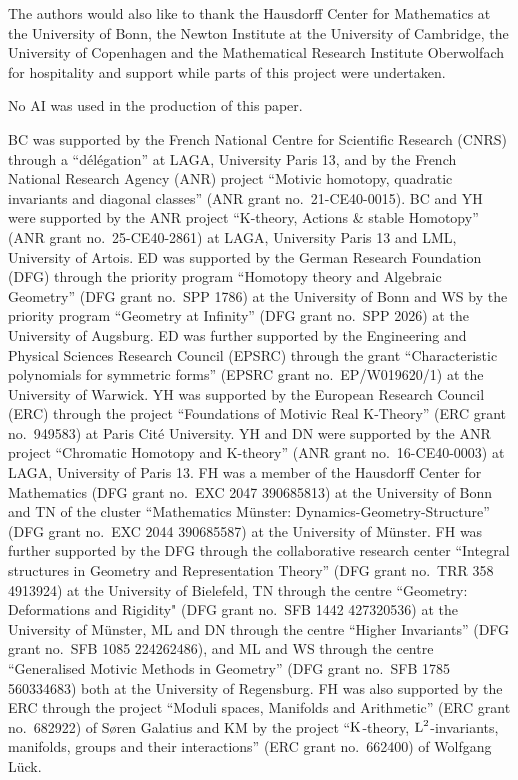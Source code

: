 The authors would also like to thank the Hausdorff Center for Mathematics at the University of Bonn, the Newton Institute at the University of Cambridge, the University of Copenhagen and the Mathematical Research Institute Oberwolfach for hospitality and support while parts of this project were undertaken.
\medskip

No AI was used in the production of this paper.
\medskip

BC was supported by the French National Centre for Scientific Research (CNRS) through a ``délégation'' at LAGA, University Paris 13, and by the French National Research Agency (ANR) project ``Motivic homotopy, quadratic invariants and diagonal classes'' (ANR grant no.\ 21-CE40-0015).
BC and YH were supported by the ANR project ``K-theory, Actions \& stable Homotopy'' (ANR grant no.\ 25-CE40-2861) at LAGA, University Paris 13 and LML, University of Artois.
ED was supported by the German Research Foundation (DFG) through the priority program ``Homotopy theory and Algebraic Geometry'' (DFG grant no.\ SPP 1786) at the University of Bonn and WS by the priority program ``Geometry at Infinity'' (DFG grant no.\ SPP 2026) at the University of Augsburg. ED was further supported by the Engineering and Physical Sciences Research Council (EPSRC) through the grant ``Characteristic polynomials for symmetric forms'' (EPSRC grant no.\ EP/W019620/1) at the University of Warwick.
YH was supported by the European Research Council (ERC) through the project ``Foundations of Motivic Real K-Theory'' (ERC grant no.\ 949583) at Paris Cité University.
YH and DN were supported by the ANR project ``Chromatic Homotopy and K-theory'' (ANR grant no.\ 16-CE40-0003) at LAGA, University of Paris 13.
FH was a member of the Hausdorff Center for Mathematics (DFG grant no.\ EXC 2047 390685813) at the University of Bonn and TN of the cluster ``Mathematics Münster: Dynamics-Geometry-Structure'' (DFG grant no.\ EXC 2044 390685587) at the University of Münster. 
FH was further supported by the DFG through the collaborative research center ``Integral structures in Geometry and Representation Theory'' (DFG grant no.\ TRR 358 4913924) at the University of Bielefeld, TN through the centre ``Geometry: Deformations and Rigidity" (DFG grant no.\ SFB 1442 427320536) at the University of Münster, ML and DN through the centre ``Higher Invariants'' (DFG grant no.\ SFB 1085 224262486), and ML and WS through the centre ``Generalised Motivic Methods in Geometry'' (DFG grant no.\ SFB 1785 560334683) both at the University of Regensburg.
FH was also supported by the ERC through the project ``Moduli spaces, Manifolds and Arithmetic'' (ERC grant no.\ 682922) of Søren Galatius and KM by the project ``$\operatorname K$-theory, $\operatorname L^2$-invariants, manifolds, groups and their interactions'' (ERC grant no.\ 662400) of Wolfgang Lück. 
